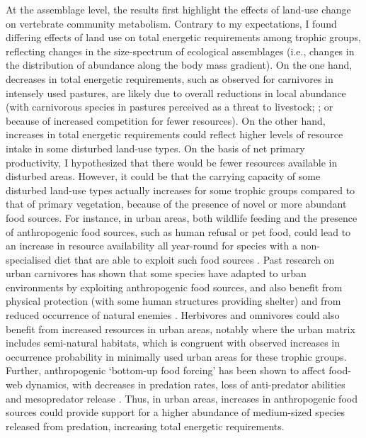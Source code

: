 At the assemblage level, the results first highlight the effects of land-use change on vertebrate community metabolism. Contrary to my expectations, I found differing effects of land use on total energetic requirements among trophic groups, reflecting changes in the size-spectrum of ecological assemblages (i.e., changes in the distribution of abundance along the body mass gradient). On the one hand, decreases in total energetic requirements, such as observed for carnivores in intensely used pastures, are likely due to overall reductions in local abundance (with carnivorous species in pastures perceived as a threat to livestock; \cite{VanEeden2018}; or because of increased competition for fewer resources). On the other hand, increases in total energetic requirements could reflect higher levels of resource intake in some disturbed land-use types. On the basis of net primary productivity, I hypothesized that there would be fewer resources available in disturbed areas. However, it could be that the carrying capacity of some disturbed land-use types actually increases for some trophic groups compared to that of primary vegetation, because of the presence of novel or more abundant food sources. For instance, in urban areas, both wildlife feeding and the presence of anthropogenic food sources, such as human refusal or pet food, could lead to an increase in resource availability all year-round for species with a non-specialised diet that are able to exploit such food sources \citep{Fischer2012}.
Past research on urban carnivores has shown that some species have adapted to urban environments by exploiting anthropogenic food sources, and also benefit from physical protection (with some human structures providing shelter) and from reduced occurrence of natural enemies \citep{Bateman2012}. Herbivores and omnivores could also benefit from increased resources in urban areas, notably where the urban matrix includes semi-natural habitats, which is congruent with observed increases in occurrence probability in minimally used urban areas for these trophic groups. Further, anthropogenic `bottom-up food forcing' has been shown to affect food-web dynamics, with decreases in predation rates, loss of anti-predator abilities \citep{Geffroy2020} and mesopredator release \citep{Fischer2012}.  Thus, in urban areas, increases in anthropogenic food sources could provide support for a higher abundance of medium-sized species released from predation, increasing total energetic requirements.

